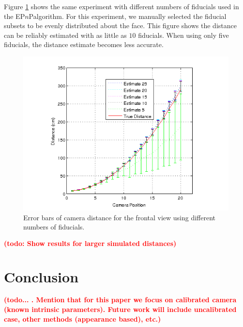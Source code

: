\documentclass[runningheads]{llncs}
\newcommand {\afbnote} [1] {{\bf \textcolor{red}{(#1)}}}
\newcommand {\EPnP} {EP$n$P}
\begin{document}
Figure \ref{fig:error_bar_frontal_lessfiducials} shows the same experiment with different numbers of fiducials used in the \EPnP algorithm.  For this experiment, we manually selected the fiducial subsets to be evenly distributed about the face.  This figure shows the distance can be reliably estimated with as little as $10$ fiducials.  When using only five fiducials, the distance estimate becomes less accurate.  

\begin{figure}[h]
\centering
\includegraphics[width=.5\linewidth]{resources/figures/errorbar_frontal_lessfiducials.png}
\caption{Error bars of camera distance for the frontal view using different numbers of fiducials.}
\label{fig:error_bar_frontal_lessfiducials}
\end{figure}

\afbnote{todo: Show results for larger simulated distances}

\section{Conclusion}
\afbnote{todo... .  Mention that for this paper we focus on calibrated camera (known intrinsic parameters).  Future work will include uncalibrated case, other methods (appearance based), etc.}



\end{document}
